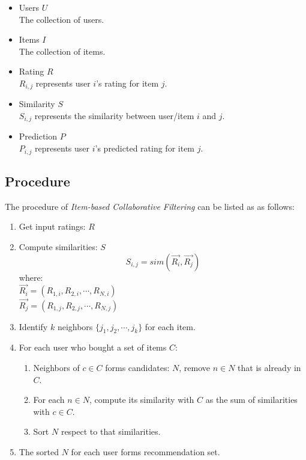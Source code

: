 \documentclass[11pt,a4paper,titlepage]{article}
\begin{document}
\begin{itemize}
\item Users $U$\\
        The collection of users.
\item Items $I$\\
        The collection of items.
\item Rating $R$\\
        $R_{i,j}$ represents user $i$'s rating for item $j$.
\item Similarity $S$\\
        $S_{i,j}$ represents the similarity between user/item $i$ and $j$.
\item Prediction $P$ \\
        $P_{i,j}$ represents user $i$'s predicted rating for item $j$.
\end{itemize}

\subsection{Procedure}

The procedure of \emph{Item-based Collaborative Filtering} can be listed as as follows:

\begin{enumerate}
\item Get input ratings: $R$
\item Compute similarities: $S$
    \begin{equation}
        S_{i,j} = sim(\vec{R_i},\vec{R_j})
    \end{equation}
    where: \\
    $\vec{R_i} = (R_{1,i},R_{2,i},\cdots,R_{N,i})$\\
    $\vec{R_j} = (R_{1,j},R_{2,j},\cdots,R_{N,j})$
\item Identify $k$ neighbors $\{j_1,j_2,\cdots,j_k\}$ for each item.
\item For each user who bought a set of items $C$:
    \begin{enumerate}
    \item Neighbors of $c \in C$ forms candidates: $N$, remove $n \in N$ that is already in $C$.
    \item For each $n \in N$, compute its similarity with $C$ as the sum of similarities with $c \in C$.
    \item Sort $N$ respect to that similarities.
    \end{enumerate}
\item The sorted $N$ for each user forms recommendation set.
\end{enumerate}
\end{document}
